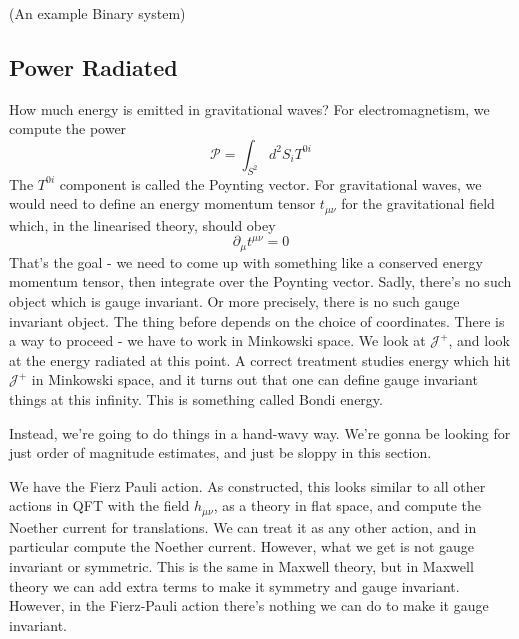 \begin{example}{(An example Binary system)}
\subsection{Power Radiated} 
How much energy is emitted in gravitational waves? 
For electromagnetism, we compute the 
power 
\[
 \mathcal{ P }  = \int_{ S ^ 2 } d ^ 2 S_i T ^{ 0 i }
\] The $ T ^{ 0i } $ component is called 
the Poynting vector. 
For gravitational waves, we would need to define
an energy momentum tensor $t _{ \mu \nu } $ 
for the gravitational field which, in the linearised 
theory, should obey 
\[
 \partial  _ \mu t ^{ \mu \nu }  = 0
\] That's the goal - 
we need to come up with 
something like a conserved energy momentum tensor, 
then integrate over the Poynting vector. 
Sadly, there's no such object which is gauge 
invariant. Or more precisely, 
there is no such gauge invariant object. 
The thing before depends on the choice of coordinates. 
There is a way to proceed - we have to work 
in Minkowski space. We look at $ \mathscr { J }^ +  $, 
and look at the energy radiated at this point. 
A correct treatment studies 
energy which hit $ \mathscr{ J  } ^ + $ in Minkowski 
space, and it turns out 
that one can define gauge invariant things at this 
infinity. This is something called Bondi energy. 

Instead, we're going to do things in a hand-wavy way. 
We're gonna be looking for 
just order of magnitude estimates, and just 
be sloppy in this section.

We have the Fierz Pauli action. 
As constructed, this looks similar to 
all other actions in QFT with the field $ h _{ \mu \nu } $, 
as a theory in flat space, and compute the Noether current 
for translations. 
We can treat it as any other action, 
and in particular compute the Noether current. 
However, what we get is 
not gauge invariant or symmetric. This is 
the same in Maxwell theory, but 
in Maxwell theory we can add extra terms to make it 
symmetry and gauge invariant. However, in the 
Fierz-Pauli action there's nothing we can do to 
make it gauge invariant. 


\end{example}
